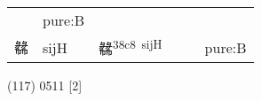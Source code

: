 \documentclass[14pt,a4paper]{scrartcl}
\begin{document}
\begin{longtable}[c]{@{}llllll@{}}
\begin{minipage}[t]{0.14\columnwidth}
\strut\end{minipage} &
\begin{minipage}[t]{0.14\columnwidth}\raggedright\strut
pure:B
\strut\end{minipage}\tabularnewline
\begin{minipage}[t]{0.14\columnwidth}\raggedright\strut
㣈
\strut\end{minipage} &
\begin{minipage}[t]{0.14\columnwidth}\raggedright\strut
sijH
\strut\end{minipage} &
\begin{minipage}[t]{0.14\columnwidth}\raggedright\strut
㣈\textsuperscript{38c8~sijH}
\strut\end{minipage} &
\begin{minipage}[t]{0.14\columnwidth}\raggedright\strut
\strut\end{minipage} &
\begin{minipage}[t]{0.14\columnwidth}\raggedright\strut
\strut\end{minipage} &
\begin{minipage}[t]{0.14\columnwidth}\raggedright\strut
pure:B
\strut\end{minipage}\tabularnewline
\bottomrule
\end{longtable}

(117) 0511 {[}2{]}
\end{document}
